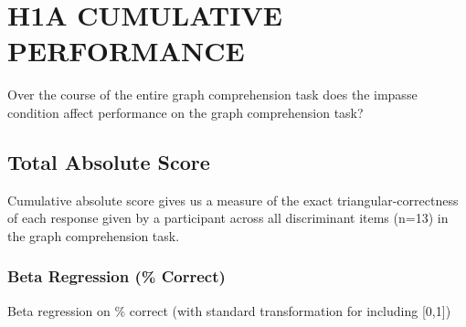 \documentclass[
  letterpaper,
  DIV=11,
  numbers=noendperiod]{scrreprt}
\newenvironment{Shaded}{\begin{snugshade}}{\end{snugshade}}
\newcommand{\DecValTok}[1]{\textcolor[rgb]{0.68,0.00,0.00}{#1}}
\newcommand{\FloatTok}[1]{\textcolor[rgb]{0.68,0.00,0.00}{#1}}
\newcommand{\FunctionTok}[1]{\textcolor[rgb]{0.28,0.35,0.67}{#1}}
\newcommand{\NormalTok}[1]{\textcolor[rgb]{0.00,0.23,0.31}{#1}}
\newcommand{\OtherTok}[1]{\textcolor[rgb]{0.00,0.23,0.31}{#1}}
\newcommand{\SpecialCharTok}[1]{\textcolor[rgb]{0.37,0.37,0.37}{#1}}
\begin{document}
\hypertarget{h1a-cumulative-performance}{%
\section{H1A \textbar{} CUMULATIVE
PERFORMANCE}\label{h1a-cumulative-performance}}

Over the course of the entire graph comprehension task does the impasse
condition affect performance on the graph comprehension task?

\hypertarget{total-absolute-score-1}{%
\subsection{Total Absolute Score}\label{total-absolute-score-1}}

Cumulative absolute score gives us a measure of the exact
triangular-correctness of each response given by a participant across
all discriminant items (n=13) in the graph comprehension task.

\hypertarget{beta-regression-correct}{%
\subsubsection{Beta Regression (\%
Correct)}\label{beta-regression-correct}}

Beta regression on \% correct (with standard transformation for
including {[}0,1{]})

\begin{Shaded}
\end{Shaded}
\end{document}
